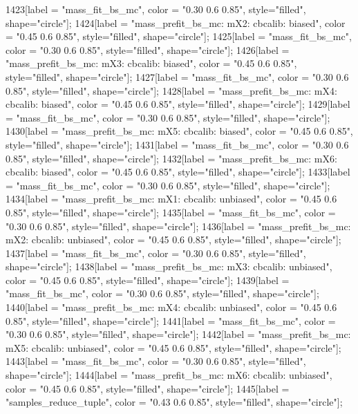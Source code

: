 {	1423[label = "mass_fit_bs_mc", color = "0.30 0.6 0.85", style="filled", shape="circle"];
	1424[label = "mass_prefit_bs_mc\nmassbin: mX2\nmassmodel: cbcalib\ntrigger: biased", color = "0.45 0.6 0.85", style="filled", shape="circle"];
	1425[label = "mass_fit_bs_mc", color = "0.30 0.6 0.85", style="filled", shape="circle"];
	1426[label = "mass_prefit_bs_mc\nmassbin: mX3\nmassmodel: cbcalib\ntrigger: biased", color = "0.45 0.6 0.85", style="filled", shape="circle"];
	1427[label = "mass_fit_bs_mc", color = "0.30 0.6 0.85", style="filled", shape="circle"];
	1428[label = "mass_prefit_bs_mc\nmassbin: mX4\nmassmodel: cbcalib\ntrigger: biased", color = "0.45 0.6 0.85", style="filled", shape="circle"];
	1429[label = "mass_fit_bs_mc", color = "0.30 0.6 0.85", style="filled", shape="circle"];
	1430[label = "mass_prefit_bs_mc\nmassbin: mX5\nmassmodel: cbcalib\ntrigger: biased", color = "0.45 0.6 0.85", style="filled", shape="circle"];
	1431[label = "mass_fit_bs_mc", color = "0.30 0.6 0.85", style="filled", shape="circle"];
	1432[label = "mass_prefit_bs_mc\nmassbin: mX6\nmassmodel: cbcalib\ntrigger: biased", color = "0.45 0.6 0.85", style="filled", shape="circle"];
	1433[label = "mass_fit_bs_mc", color = "0.30 0.6 0.85", style="filled", shape="circle"];
	1434[label = "mass_prefit_bs_mc\nmassbin: mX1\nmassmodel: cbcalib\ntrigger: unbiased", color = "0.45 0.6 0.85", style="filled", shape="circle"];
	1435[label = "mass_fit_bs_mc", color = "0.30 0.6 0.85", style="filled", shape="circle"];
	1436[label = "mass_prefit_bs_mc\nmassbin: mX2\nmassmodel: cbcalib\ntrigger: unbiased", color = "0.45 0.6 0.85", style="filled", shape="circle"];
	1437[label = "mass_fit_bs_mc", color = "0.30 0.6 0.85", style="filled", shape="circle"];
	1438[label = "mass_prefit_bs_mc\nmassbin: mX3\nmassmodel: cbcalib\ntrigger: unbiased", color = "0.45 0.6 0.85", style="filled", shape="circle"];
	1439[label = "mass_fit_bs_mc", color = "0.30 0.6 0.85", style="filled", shape="circle"];
	1440[label = "mass_prefit_bs_mc\nmassbin: mX4\nmassmodel: cbcalib\ntrigger: unbiased", color = "0.45 0.6 0.85", style="filled", shape="circle"];
	1441[label = "mass_fit_bs_mc", color = "0.30 0.6 0.85", style="filled", shape="circle"];
	1442[label = "mass_prefit_bs_mc\nmassbin: mX5\nmassmodel: cbcalib\ntrigger: unbiased", color = "0.45 0.6 0.85", style="filled", shape="circle"];
	1443[label = "mass_fit_bs_mc", color = "0.30 0.6 0.85", style="filled", shape="circle"];
	1444[label = "mass_prefit_bs_mc\nmassbin: mX6\nmassmodel: cbcalib\ntrigger: unbiased", color = "0.45 0.6 0.85", style="filled", shape="circle"];
	1445[label = "samples_reduce_tuple", color = "0.43 0.6 0.85", style="filled", shape="circle"];
}
